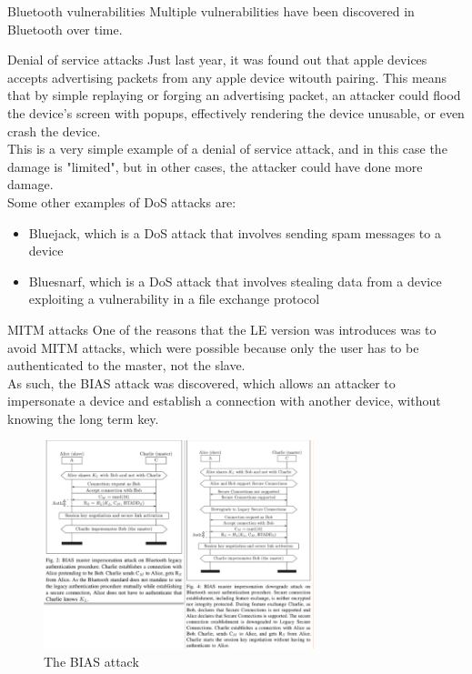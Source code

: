 \begin{section}{Bluetooth vulnerabilities}
  Multiple vulnerabilities have been discovered in Bluetooth over time.
  \begin{subsection}{Denial of service attacks}
    Just last year, it was found out that apple devices accepts advertising packets from any apple
    device witouth pairing. This means that by simple replaying or forging an advertising packet, an
    attacker could flood the device's screen with popups, effectively rendering the device unusable,
    or even crash the device.\\
    This is a very simple example of a denial of service attack, and in this case the damage is
    "limited", but in other cases, the attacker could have done more damage.\\
    Some other examples of DoS attacks are:
    \begin{itemize}
      \item Bluejack, which is a DoS attack that involves sending spam messages to a device
      \item Bluesnarf, which is a DoS attack that involves stealing data from a device exploiting a
        vulnerability in a file exchange protocol
    \end{itemize}
  \end{subsection}
  \begin{subsection}{MITM attacks}
    One of the reasons that the LE version was introduces was to avoid MITM attacks, which were
    possible because only the user has to be authenticated to the master, not the slave.\\
    As such, the BIAS attack was discovered, which allows an attacker to impersonate a device and
    establish a connection with another device, without knowing the long term key.\\
    \begin{figure}[H]
      \centering
      \includegraphics[width=0.7\textwidth]{img/wireless/bias attack.png}
      \caption{The BIAS attack}
    \end{figure}


  \end{subsection}

\end{section}

